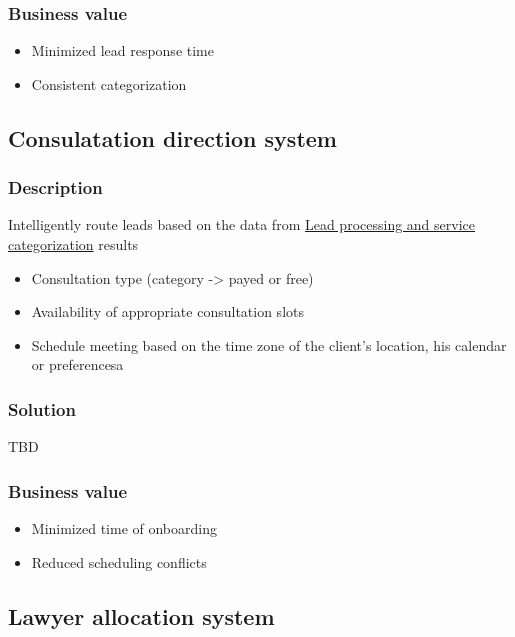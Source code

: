\documentclass[11pt]{article}
\begin{document}
\subsubsection{Business value}
\label{sec:org973b72e}

\begin{itemize}
\item Minimized lead response time
\item Consistent categorization
\end{itemize}
\subsection{Consulatation direction system}
\label{sec:org8175169}

\subsubsection{Description}
\label{sec:org30b8454}

Intelligently route leads based on the data from \hyperref[sec:org1b6bb15]{Lead processing and service categorization} results
\begin{itemize}
\item Consultation type (category -> payed or free)
\item Availability of appropriate consultation slots
\item Schedule meeting based on the time zone of the client's location, his calendar or preferencesa
\end{itemize}
\subsubsection{Solution}
\label{sec:org75cecac}

TBD
\subsubsection{Business value}
\label{sec:orgfd0a9dc}

\begin{itemize}
\item Minimized time of onboarding
\item Reduced scheduling conflicts
\end{itemize}
\subsection{Lawyer allocation system}
\label{sec:orgcbad932}
\end{document}
